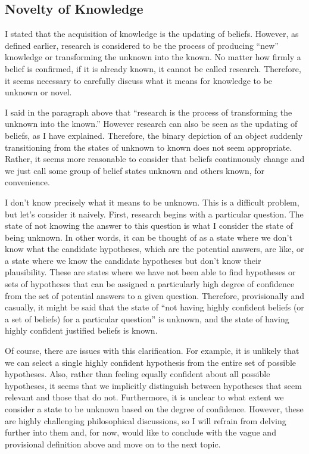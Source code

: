 \documentclass{book}
\begin{document}
\subsection{Novelty of Knowledge}
I stated that the acquisition of knowledge is the updating of beliefs. However, as defined earlier, research is considered to be the process of producing ``new'' knowledge or transforming the unknown into the known. No matter how firmly a belief is confirmed, if it is already known, it cannot be called research. Therefore, it seems necessary to carefully discuss what it means for knowledge to be unknown or novel.

I said in the paragraph above that ``research is the process of transforming the unknown into the known.'' However research can also be seen as the updating of beliefs, as I have explained. Therefore, the binary depiction of an object suddenly transitioning from the states of unknown to known does not seem appropriate. Rather, it seems more reasonable to consider that beliefs continuously change and we just call some group of belief states unknown and others known, for convenience.

I don't know precisely what it means to be unknown. This is a difficult problem, but let's consider it naively. First, research begins with a particular question. The state of not knowing the answer to this question is what I consider the state of being unknown. In other words, it can be thought of as a state where we don't know what the candidate hypotheses, which are the potential answers, are like, or a state where we know the candidate hypotheses but don't know their plausibility. These are states where we have not been able to find hypotheses or sets of hypotheses that can be assigned a particularly high degree of confidence from the set of potential answers to a given question. Therefore, provisionally and casually, it might be said that the state of ``not having highly confident beliefs (or a set of beliefs) for a particular question'' is unknown, and the state of having highly confident justified beliefs is known.

Of course, there are issues with this clarification. For example, it is unlikely that we can select a single highly confident hypothesis from the entire set of possible hypotheses. Also, rather than feeling equally confident about all possible hypotheses, it seems that we implicitly distinguish between hypotheses that seem relevant and those that do not. Furthermore, it is unclear to what extent we consider a state to be unknown based on the degree of confidence. However, these are highly challenging philosophical discussions, so I will refrain from delving further into them and, for now, would like to conclude with the vague and provisional definition above and move on to the next topic.
\end{document}
